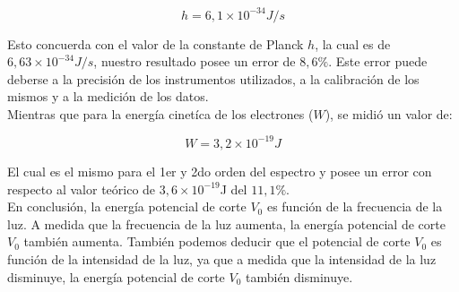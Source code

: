 \documentclass[a4paper]{article}
\begin{document}
    \begin{equation}
      h = 6,1 \times 10^{-34} J/s
    \end{equation}
    

    \indent Esto concuerda con el valor de la constante de Planck $h$, la cual es de $6,63 \times 10^{-34} J/s$, nuestro resultado posee un error de $8,6\%$. Este error puede deberse a la precisión de los instrumentos utilizados, a la calibración de los mismos y a la medición de los datos.\\
    \indent Mientras que para la energía cinetíca de los electrones ($W$), se midió un valor de:
    

    \begin{equation}
      W = 3,2 \times 10^{-19} J
    \end{equation}

    \indent El cual es el mismo para el 1er y 2do orden del espectro y posee un error con respecto al valor teórico de $3,6 \times 10^{-19}$J del $11,1\%$.\\
    \indent En conclusión, la energía potencial de corte $V_{0}$ es función de la frecuencia de la luz. A medida que la frecuencia de la luz aumenta, la energía potencial de corte $V_{0}$ también aumenta. También podemos deducir que el potencial de corte $V_{0}$ es función de la intensidad de la luz, ya que a medida que la intensidad de la luz disminuye, la energía potencial de corte $V_{0}$ también disminuye.
\end{document}

